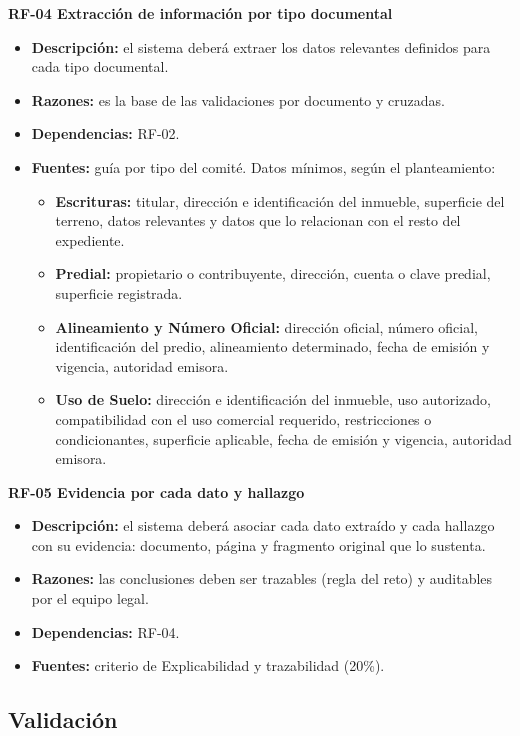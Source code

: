 \documentclass[11pt, a4paper]{article}
\begin{document}
\textbf{RF-04 Extracción de información por tipo documental}
\begin{itemize}
    \item \textbf{Descripción:} el sistema deberá extraer los datos relevantes definidos para cada tipo documental.
    \item \textbf{Razones:} es la base de las validaciones por documento y cruzadas.
    \item \textbf{Dependencias:} RF-02.
    \item \textbf{Fuentes:} guía por tipo del comité. Datos mínimos, según el planteamiento:
    \begin{itemize}
        \item \textbf{Escrituras:} titular, dirección e identificación del inmueble, superficie del terreno, datos relevantes y datos que lo relacionan con el resto del expediente.
        \item \textbf{Predial:} propietario o contribuyente, dirección, cuenta o clave predial, superficie registrada.
        \item \textbf{Alineamiento y Número Oficial:} dirección oficial, número oficial, identificación del predio, alineamiento determinado, fecha de emisión y vigencia, autoridad emisora.
        \item \textbf{Uso de Suelo:} dirección e identificación del inmueble, uso autorizado, compatibilidad con el uso comercial requerido, restricciones o condicionantes, superficie aplicable, fecha de emisión y vigencia, autoridad emisora.
    \end{itemize}
\end{itemize}

\textbf{RF-05 Evidencia por cada dato y hallazgo}
\begin{itemize}
    \item \textbf{Descripción:} el sistema deberá asociar cada dato extraído y cada hallazgo con su evidencia: documento, página y fragmento original que lo sustenta.
    \item \textbf{Razones:} las conclusiones deben ser trazables (regla del reto) y auditables por el equipo legal.
    \item \textbf{Dependencias:} RF-04.
    \item \textbf{Fuentes:} criterio de Explicabilidad y trazabilidad (20\%).
\end{itemize}

\subsection*{Validación}
\end{document}
